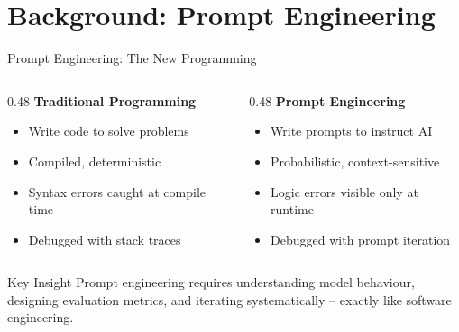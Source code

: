 \documentclass[aspectratio=169, 12pt]{beamer}
\begin{document}
\section{Background: Prompt Engineering}

\begin{frame}{Prompt Engineering: The New Programming}
  \begin{columns}[T]
    \begin{column}{0.48\textwidth}
      \textbf{Traditional Programming}
      \begin{itemize}
        \item Write code to solve problems
        \item Compiled, deterministic
        \item Syntax errors caught at compile time
        \item Debugged with stack traces
      \end{itemize}
    \end{column}
    \begin{column}{0.48\textwidth}
      \textbf{Prompt Engineering}
      \begin{itemize}
        \item Write prompts to instruct AI
        \item Probabilistic, context-sensitive
        \item Logic errors visible only at runtime
        \item Debugged with prompt iteration
      \end{itemize}
    \end{column}
  \end{columns}
  \vspace{1em}
  \begin{alertblock}{Key Insight}
    Prompt engineering requires understanding model behaviour, designing evaluation
    metrics, and iterating systematically -- exactly like software engineering.
  \end{alertblock}
\end{frame}
\end{document}
